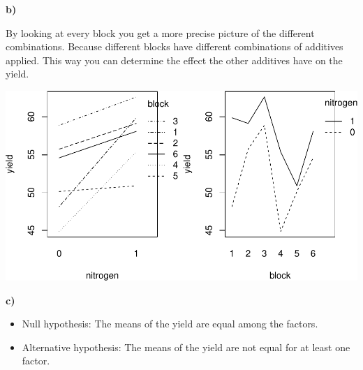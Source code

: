 \documentclass[
]{article}
\newenvironment{Shaded}{\begin{snugshade}}{\end{snugshade}}
\newcommand{\AttributeTok}[1]{\textcolor[rgb]{0.77,0.63,0.00}{#1}}
\newcommand{\DecValTok}[1]{\textcolor[rgb]{0.00,0.00,0.81}{#1}}
\newcommand{\FunctionTok}[1]{\textcolor[rgb]{0.00,0.00,0.00}{#1}}
\newcommand{\NormalTok}[1]{#1}
\newcommand{\SpecialCharTok}[1]{\textcolor[rgb]{0.00,0.00,0.00}{#1}}
\newcommand{\StringTok}[1]{\textcolor[rgb]{0.31,0.60,0.02}{#1}}
\begin{document}
\textbf{b)}

By looking at every block you get a more precise picture of the
different combinations. Because different blocks have different
combinations of additives applied. This way you can determine the effect
the other additives have on the yield.

\begin{Shaded}
\end{Shaded}

\includegraphics{assignment_1_files/figure-latex/unnamed-chunk-27-1.pdf}

\textbf{c)}

\begin{itemize}
\item
  Null hypothesis: The means of the yield are equal among the factors.
\item
  Alternative hypothesis: The means of the yield are not equal for at
  least one factor.
\end{itemize}
\end{document}
